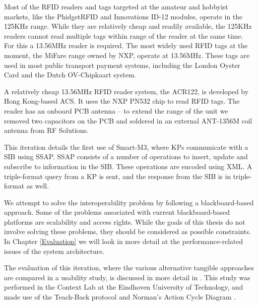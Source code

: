 Most of the \ac{RFID} readers and tags targeted at the amateur and hobbyist markets, like the PhidgetRFID and Innovations ID-12 modules, operate in the 125KHz range. While they are relatively cheap and readily available, the 125KHz readers cannot read multiple tags within range of the reader at the same time. For this a 13.56MHz reader is required. The most widely used \ac{RFID} tags at the moment, the MiFare range owned by NXP, operate at 13.56MHz. These tags are used in most public transport payment systems, including the London Oyster Card and the Dutch OV-Chipkaart system.

A relatively cheap 13.56MHz \ac{RFID} reader system, the ACR122, is developed by Hong Kong-based \ac{ACS}. It uses the NXP PN532 chip to read \ac{RFID} tags.  The reader has an onboard PCB antenna -- to extend the range of the unit we removed two capacitors on the PCB and soldered in an external ANT-1356M coil antenna from RF Solutions.

This iteration details the first use of Smart-M3, where \acp{KP} communicate with a \ac{SIB} using \ac{SSAP}\cite{Honkola2010}. \ac{SSAP} consists of a number of operations to insert, update and subscribe to information in the SIB. These operations are encoded using XML. A triple-format query from a \ac{KP} is sent, and the response from the \ac{SIB} is in triple-format as well. %

We attempt to solve the interoperability problem by following a blackboard-based approach. Some of the problems associated with current blackboard-based platforms are scalability and access rights. While the goals of this thesis do not involve solving these problems, they should be considered as possible constraints. In Chapter \ref{Evaluation} we will look in more detail at the performance-related issues of the system architecture. 

The evaluation of this iteration, where the various alternative tangible approaches are compared in a usability study, is discussed in more detail in \cite{Kwak2011}. This study was performed in the Context Lab at the Eindhoven University of Technology, and made use of the Teach-Back protocol \cite{VanDerVeer2003} and Norman's Action Cycle Diagram \cite{Norman1998}.




